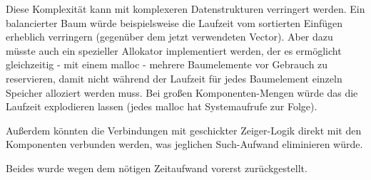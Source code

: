 Diese Komplexität kann mit komplexeren Datenstrukturen verringert werden. Ein balancierter Baum würde beispielsweise die Laufzeit vom sortierten Einfügen erheblich verringern (gegenüber dem jetzt verwendeten Vector). Aber dazu müsste auch ein spezieller Allokator implementiert werden, der es ermöglicht gleichzeitig - mit einem malloc - mehrere Baumelemente vor Gebrauch zu reservieren, damit nicht während der Laufzeit für jedes Baumelement einzeln Speicher alloziert werden muss. Bei großen Komponenten-Mengen würde das die Laufzeit explodieren lassen (jedes malloc hat Systemaufrufe zur Folge).

Außerdem könnten die Verbindungen mit geschickter Zeiger-Logik direkt mit den Komponenten verbunden werden, was jeglichen Such-Aufwand eliminieren würde.

Beides wurde wegen dem nötigen Zeitaufwand vorerst zurückgestellt.